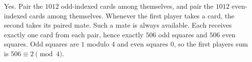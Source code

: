 Yes. Pair the $1012$ odd-indexed cards among themselves, and pair the $1012$ even-indexed cards among themselves. Whenever the first player takes a card, the second takes its paired mate. Such a mate is always available. Each receives exactly one card from each pair, hence exactly $506$ odd squares and $506$ even squares. Odd squares are $1$ modulo $4$ and even squares $0$, so the first player\textquotesingle s sum is $506\equiv2\pmod4$.
